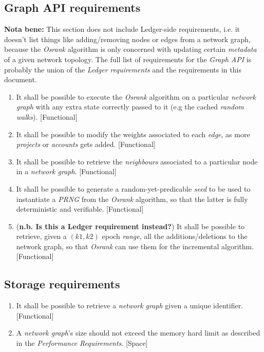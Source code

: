 \documentclass{article}
\begin{document}
\subsection{Graph API requirements}

\textbf{Nota bene:} This section does not include Ledger-side requirements,
i.e. it doesn't list things like adding/removing nodes or edges from a
network graph, because the \textit{Osrank} algorithm is only concerned
with updating certain \textit{metadata} of a given network topology.
The full list of requirements for the \textit{Graph API} is probably the
union of the \textit{Ledger requirements} and the requirements in
this document.

\begin{enumerate}
\item It shall be possible to execute the \textit{Osrank} algorithm on a
      particular \textit{network graph} with any extra state correctly
      passed to it (e.g the cached \textit{random walks}). [Functional]
\item It shall be possible to modify the weights associated to each
      \textit{edge}, as more \textit{projects} or \textit{accounts} gets
      added. [Functional]
\item It shall be possible to retrieve the \textit{neighbours} associated
      to a particular node in a \textit{network graph}. [Functional]
\item It shall be possible to generate a random-yet-predicable \textit{seed}
      to be used to instantiate a \textit{PRNG} from the \textit{Osrank}
      algorithm, so that the latter is fully deterministic and verifiable.
      [Functional]
\item (\textbf{n.b. Is this a Ledger requirement instead?})
      It shall be possible to retrieve, given a $(k1,k2)$ epoch
      \textit{range}, all the additions/deletions to the network
      graph, so that \textit{Osrank} can use them for the
      incremental algorithm. [Functional]
\end{enumerate}

\subsection{Storage requirements}

\begin{enumerate}
\item It shall be possible to retrieve a \textit{network graph}
      given a unique identifier. [Functional]
\item A \textit{network graph}'s size should not exceed the memory hard
      limit as described in the \textit{Performance Requirements}. [Space]
\end{enumerate}
\end{document}
